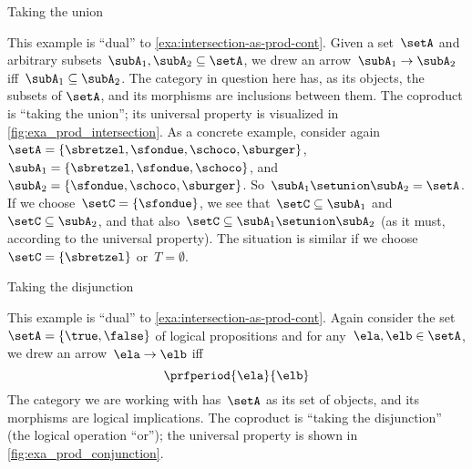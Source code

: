 \begin{marginfigure}
	\centering
	\caption{Taking the union}
	\label{fig:exa_coprod_union_cont}
\end{marginfigure}

\begin{example}
	\label{exa:union-as-coprod-cont}
	This example is ``dual'' to \cref{exa:intersection-as-prod-cont}.
	Given a set~$\setA$ and arbitrary subsets~$\subA_1, \subA_2 \subseteq \setA$, we drew an arrow~$\subA_1 \to \subA_2$ iff~$\subA_1 \subseteq \subA_2$.
	The category in question here has, as its objects, the subsets of $\setA$, and its morphisms are inclusions between them.
	The coproduct is ``taking the union''; its universal property is visualized in \cref{fig:exa_prod_intersection}.
	As a concrete example, consider again~$\setA = \{ \sbretzel, \sfondue, \schoco, \sburger \}$,~$\subA_1 = \{ \sbretzel, \sfondue, \schoco \}$, and~$\subA_2 = \{\sfondue, \schoco, \sburger \}$.
	So~$\subA_1 \setunion \subA_2 = \setA$.
	If we choose~$\setC = \{ \sfondue \}$, we see that~$\setC \subseteq \subA_1$ and~$\setC \subseteq \subA_2$, and that also~$\setC \subseteq \subA_1 \setunion \subA_2$ (as it must, according to the universal property).
	The situation is similar if we choose~$\setC = \{ \sbretzel \}$ or~$T = \emptyset$.
\end{example}

\begin{marginfigure}
	\centering
	\caption{Taking the disjunction}
	\label{fig:exa_coprod_disjunction_cont}
\end{marginfigure}

\begin{example}
	\label{exa:disjunction-as-coprod-cont}
	This example is ``dual'' to \cref{exa:intersection-as-prod-cont}.
	Again consider the set~$\setA = \{ \true, \false \}$ of logical propositions and for any~$\ela, \elb  \in \setA$, we drew an arrow~$\ela \to \elb$ iff
	\begin{equation*}
		\prfperiod{\ela}{\elb}
	\end{equation*}
	The category we are working with has~$\setA$ as its set of objects, and its morphisms are logical implications.
	The coproduct is ``taking the disjunction'' (the logical operation ``or''); the universal property is shown in \cref{fig:exa_prod_conjunction}.
\end{example}

